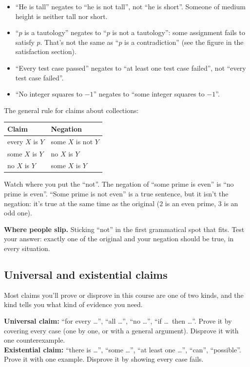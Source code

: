 \begin{itemize}
  \item ``He is tall'' negates to ``he is not tall'', not ``he is short''. Someone of medium height is neither tall nor short.
  \item ``$p$ is a tautology'' negates to ``$p$ is not a tautology'': some assignment fails to satisfy $p$. That's not the same as ``$p$ is a contradiction'' (see the figure in the satisfaction section).
  \item ``Every test case passed'' negates to ``at least one test case failed'', not ``every test case failed''.
  \item ``No integer squares to $-1$'' negates to ``some integer squares to $-1$''.
\end{itemize}

The general rule for claims about collections:

\begin{center}
\begin{tabular}{ll}
\toprule
\textbf{Claim} & \textbf{Negation}\\
\midrule
every $X$ is $Y$ & some $X$ is not $Y$\\
some $X$ is $Y$ & no $X$ is $Y$\\
no $X$ is $Y$ & some $X$ is $Y$\\
\bottomrule
\end{tabular}
\end{center}

Watch where you put the ``not''. The negation of ``some prime is even'' is ``no prime is even''. ``Some prime is not even'' is a true sentence, but it isn't the negation: it's true at the same time as the original ($2$ is an even prime, $3$ is an odd one).

\textbf{Where people slip.} Sticking ``not'' in the first grammatical spot that fits. Test your answer: exactly one of the original and your negation should be true, in every situation.

\subsection{Universal and existential claims}

Most claims you'll prove or disprove in this course are one of two kinds, and the kind tells you what kind of evidence you need.

\begin{notebox}
\textbf{Universal claim:} ``for every \dots'', ``all \dots'', ``no \dots'', ``if \dots\ then \dots''. Prove it by covering every case (one by one, or with a general argument). Disprove it with one counterexample.\\
\textbf{Existential claim:} ``there is \dots'', ``some \dots'', ``at least one \dots'', ``can'', ``possible''. Prove it with one example. Disprove it by showing every case fails.
\end{notebox}

